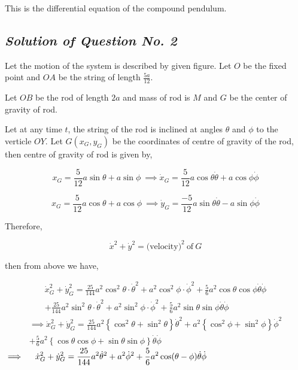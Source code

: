 \documentclass[12pt, a4paper]{article} %
\begin{document}
This is the differential equation of the compound pendulum.
\BgThispage

\pagebreak

\subsection{\slshape Solution of Question No. 2}

Let the motion of the system is described by given figure. Let $O$ be the fixed point and $OA$ be the string of length $\displaystyle \frac{5a}{12}$.

Let $OB$ be the rod of length $2a$ and mass of rod is $M$ and $G$ be the center of gravity of rod.

\begin{center}
    \def\svgwidth{10cm}
    
\end{center}

Let at any time $t$, the string of the rod is inclined at angles $\theta$ and $\phi$ to the verticle $OY$. Let $G(x_G, y_G)$ be the coordinates of centre of gravity of the rod, then centre of gravity of rod is given by,

\begin{equation*}
    x_G = \frac{5}{12}a\sin\theta + a\sin\phi\ \implies \dot{x}_G = \frac{5}{12} a\cos\theta \dot{\theta} + a\cos\phi\dot{\phi} 
\end{equation*}

\begin{equation*}
    x_G = \frac{5}{12}a\cos\theta + a\cos\phi\ \implies \dot{y}_G = \frac{-5}{12}a\sin\theta\dot{\theta} - a\sin\phi\dot{\phi}
\end{equation*} 

Therefore,

\[\dot{x}^2 + \dot{y}^2 = \mbox{(velocity)}^2\ \mbox{of}\ G\]

then from above we have,

\begin{multline*}
    \dot{x}^2_G + \dot{y}^2_G = \frac{25}{144}a^2\cos^2\theta \cdot\dot{\theta}^2 +  a^2\cos^2\phi\cdot \dot{\phi}^2 + \frac{5}{6}a^2\cos\theta\cos\phi \dot{\theta}\dot{\phi}\\
    + \frac{25}{144}a^2\sin^2\theta\cdot \dot{\theta}^2 + a^2\sin^2\phi\cdot \dot{\phi}^2 + \frac{5}{6}a^2\sin\theta\sin\phi \dot{\theta}\dot{\phi} 
\end{multline*}
\begin{multline*}
    \implies \dot{x}^2_G + \dot{y}^2_G = \frac{25}{144}a^2\left\{\cos^2\theta + \sin^2\theta\right\}\dot{\theta}^2 + a^2\left\{\cos^2\phi + \sin^2\phi\right\}\dot{\phi}^2\\
    + \frac{5}{6}a^2\left\{\cos\theta\cos\phi + \sin\theta\sin\phi\right\}\dot{\theta}\dot{\phi}
\end{multline*}
$\displaystyle \implies \hspace*{4mm} \dot{x}^2_G + \dot{y}^2_G = \frac{25}{144}a^2\dot{\theta}^2 + a^2\dot{\phi}^2 + \frac{5}{6}a^2\cos(\theta-\phi)\dot{\theta}\dot{\phi}$\\[3mm]
\end{document}
